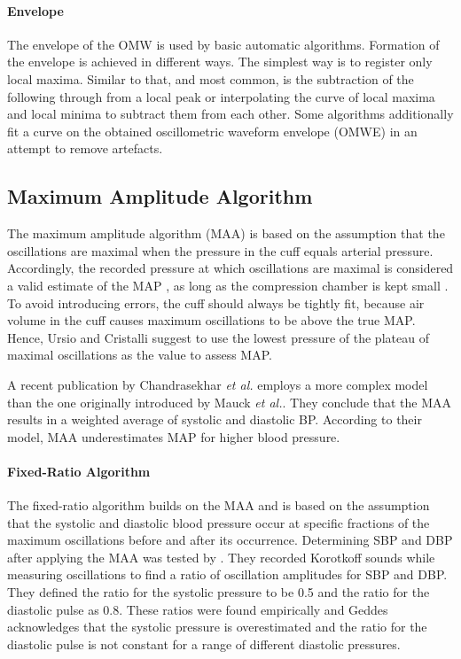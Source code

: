 \paragraph{Envelope} The envelope of the OMW is used by basic automatic algorithms. Formation of the envelope is achieved in different ways. The simplest way is to register only local maxima. Similar to that, and most common, is the subtraction of the following through from a local peak or interpolating the curve of local maxima and local minima to subtract them from each other. Some algorithms additionally fit a curve on the obtained oscillometric waveform envelope (OMWE) in an attempt to remove artefacts. \cite{Forouzanfar2014}


\subsection{Maximum Amplitude Algorithm}\label{sec:MAA}
The maximum amplitude algorithm (MAA) is based on the assumption that the oscillations are maximal when the pressure in the cuff equals arterial pressure. Accordingly, the recorded pressure at which oscillations are maximal is considered a valid estimate of the MAP \citep{Babbs2012,Geddes1982,Drzewiecki1994,Ramsey1979}, as long as the compression chamber is kept small \cite{Mauck1980}. To avoid introducing errors, the cuff should always be tightly fit, because air volume in the cuff causes maximum oscillations to be above the true MAP. Hence, Ursio and Cristalli suggest to use the lowest pressure of the plateau of maximal oscillations as the value to assess MAP.\cite{Ursino1996}

A recent publication by Chandrasekhar \textit{et al.} \cite{Chandrasekhar2019} employs a more complex model than the one originally introduced by Mauck \textit{et al.}\cite{Mauck1980}. They conclude that the MAA results in a weighted average of systolic and diastolic BP. According to their model, MAA underestimates MAP for higher blood pressure.

\paragraph{Fixed-Ratio Algorithm} The fixed-ratio algorithm builds on the MAA and is based on the assumption that the systolic and diastolic blood pressure occur at specific fractions of the maximum oscillations before and after its occurrence. Determining SBP and DBP after applying the MAA was tested by \citet{Geddes1982}. They recorded Korotkoff sounds while measuring oscillations to find a ratio of oscillation amplitudes for SBP and DBP. They defined the ratio for the systolic pressure to be 0.5 and the ratio for the diastolic pulse as 0.8. These ratios were found empirically and Geddes acknowledges that the systolic pressure is overestimated and the ratio for the diastolic pulse is not constant for a range of different diastolic pressures.

